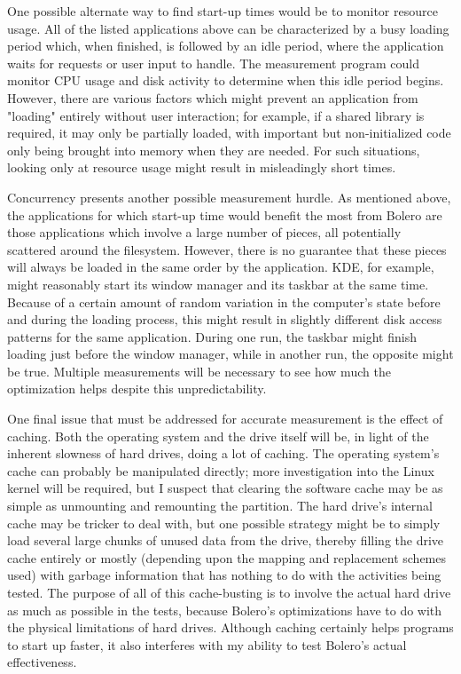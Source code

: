 \documentclass[10pt]{article}
\begin{document}
One possible alternate way to find start-up times would be to monitor resource usage. All of the listed applications
above can be characterized by a busy loading period which, when finished, is followed by an idle period, where
the application waits for requests or user input to handle. The measurement program could monitor CPU usage and disk
activity to determine when this idle period begins. However, there are various factors which might prevent an application from "loading" entirely without user interaction; for example, if a shared library is required, it may only be partially loaded, with important but non-initialized code only being brought into memory when they are needed. For such situations, looking only at resource usage might result in misleadingly short times.

Concurrency presents another possible measurement hurdle. As mentioned above, the applications for
which start-up time would benefit the most from Bolero are those applications which involve a
large number of pieces, all potentially scattered around the filesystem. However, there is no guarantee
that these pieces will always be loaded in the same order by the application. KDE, for example, might reasonably start its window manager and its taskbar at the same time. Because of a certain amount of random
variation in the computer's state before and during the loading process, this might result in
slightly different disk access patterns for the same application. During one run, the taskbar might finish loading just before the window manager, while in another run, the opposite might be true. Multiple
measurements will be necessary to see how much the optimization helps despite this unpredictability.

One final issue that must be addressed for accurate measurement is the effect of caching. Both
the operating system and the drive itself will be, in light of the inherent slowness of hard drives,
doing a lot of caching. The operating system's cache can probably be manipulated directly; more
investigation into the Linux kernel will be required, but I suspect that clearing the software
cache may be as simple as unmounting and remounting the partition. The hard drive's internal cache
may be tricker to deal with, but one possible strategy might be to simply load several large chunks of
unused data from the drive, thereby filling the drive cache entirely or mostly (depending upon the mapping
and replacement schemes used) with garbage information that has nothing to do with the activities being tested.
The purpose of all of this cache-busting is to involve the actual hard drive as much as possible
in the tests, because Bolero's optimizations have to do with the physical limitations of hard drives. Although caching certainly helps programs to start up faster, it also interferes with my ability to test Bolero's actual effectiveness.
\end{document}
